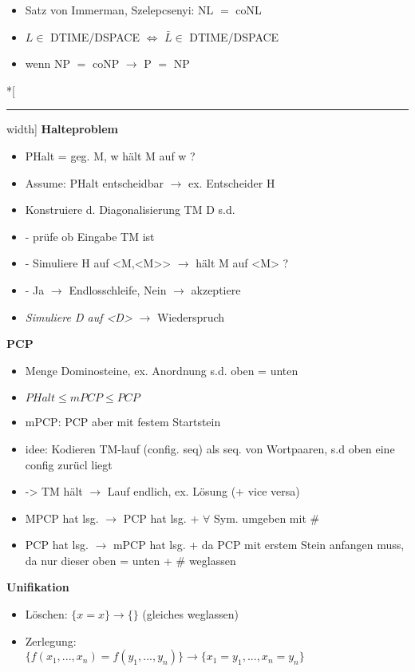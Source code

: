 \documentclass[12pt,a4paper]{article}
\begin{document}
\begin{paracol}{3}
\begin{itemize}
\item Satz von Immerman, Szelepcsenyi: NL $=$ coNL
\item $L \in$ DTIME/DSPACE $\Leftrightarrow$ $\bar{L}\in $ DTIME/DSPACE
\item wenn NP $=$ coNP $\rightarrow$ P $=$ NP
\end{itemize}
\switchcolumn[0]*[\hrule width\textwidth]
\centering
\textbf{Halteproblem}
\flushleft
\begin{itemize}
\setlength\itemsep{-0.5em}
\item PHalt = geg. M, w hält M auf w ?
\item Assume: PHalt entscheidbar $\rightarrow$ ex. Entscheider H
\item Konstruiere d. Diagonalisierung TM D s.d.
\item -  prüfe ob Eingabe TM ist
\item -  Simuliere H auf <M,<M>> $\rightarrow$ hält M auf <M> ?
\item -  Ja $\rightarrow$ Endlosschleife, Nein $\rightarrow$ akzeptiere
\item \textit{Simuliere D auf <D>} $\rightarrow$ Wiederspruch
\end{itemize}
\switchcolumn[1]
\centering
\textbf{PCP}
\flushleft
\begin{itemize}
\setlength\itemsep{-0.5em}
\item Menge Dominosteine, ex. Anordnung s.d. oben = unten
\item $PHalt \leq mPCP \leq PCP$
\item mPCP: PCP aber mit festem Startstein
\item idee: Kodieren TM-lauf (config. seq) als seq. von Wortpaaren, s.d oben eine config zurücl liegt
\item ->  TM hält $\rightarrow$ Lauf endlich, ex. Lösung (+ vice versa)
\item MPCP hat lsg. $\rightarrow$ PCP hat lsg. + $\forall$ Sym. umgeben mit \#
\item PCP hat lsg. $\rightarrow$ mPCP hat lsg. + da PCP mit erstem Stein anfangen muss, da nur dieser oben = unten + \# weglassen
\end{itemize}
\switchcolumn[2]
\centering
\textbf{Unifikation}
\flushleft
\begin{itemize}
\setlength\itemsep{-0.5em}
\item Löschen: $\{x = x\} \rightarrow \{\}$ (gleiches weglassen)
\item Zerlegung: \\ $\{f(x_1, ..., x_n) = f(y_1, ..., y_n)\} \rightarrow \{x_1=y_1, ..., x_n=y_n\}$

\end{itemize}
\end{paracol}
\end{document}
